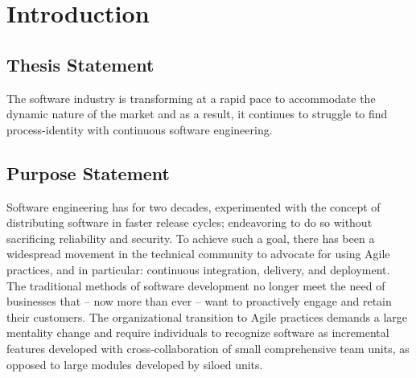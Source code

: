 \documentclass[11pt,a4paper]{article}
\begin{document}

\newpage

\section{Introduction}

\subsection{Thesis Statement}
The software industry is transforming at a rapid pace to accommodate the dynamic nature of the market and as a result, it continues to struggle to find process-identity with continuous software engineering.

\subsection{Purpose Statement}
Software engineering has for two decades, experimented with the concept of distributing software in faster release cycles; endeavoring to do so without sacrificing reliability and security. To achieve such a goal, there has been a widespread movement in the technical community to advocate for using Agile practices, and in particular: continuous integration, delivery, and deployment. The traditional methods of software development no longer meet the need of businesses that -- now more than ever -- want to proactively engage and retain their customers. The organizational transition to Agile practices demands a large mentality change and require individuals to recognize software as incremental features developed with cross-collaboration of small comprehensive team units, as opposed to large modules developed by siloed units.
\end{document}
